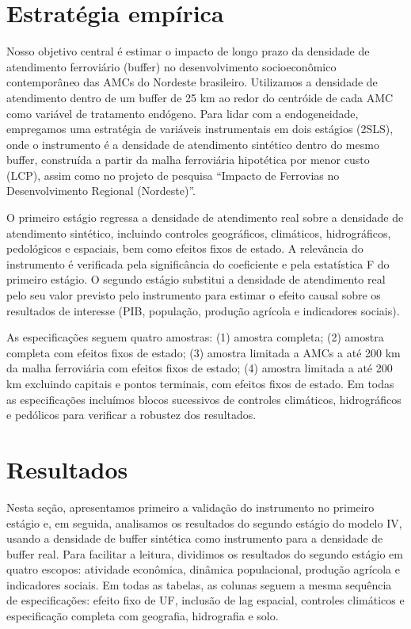 \documentclass[12pt,a4paper]{article}
\begin{document}
\section{Estratégia empírica}
Nosso objetivo central é estimar o impacto de longo prazo da densidade de atendimento ferroviário (buffer) no desenvolvimento socioeconômico contemporâneo das AMCs do Nordeste brasileiro. Utilizamos a densidade de atendimento dentro de um buffer de 25 km ao redor do centróide de cada AMC como variável de tratamento endógeno. Para lidar com a endogeneidade, empregamos uma estratégia de variáveis instrumentais em dois estágios (2SLS), onde o instrumento é a densidade de atendimento sintético dentro do mesmo buffer, construída a partir da malha ferroviária hipotética por menor custo (LCP), assim como no projeto de pesquisa “Impacto de Ferrovias no Desenvolvimento Regional (Nordeste)”.

O primeiro estágio regressa a densidade de atendimento real sobre a densidade de atendimento sintético, incluindo controles geográficos, climáticos, hidrográficos, pedológicos e espaciais, bem como efeitos fixos de estado. A relevância do instrumento é verificada pela significância do coeficiente e pela estatística F do primeiro estágio. O segundo estágio substitui a densidade de atendimento real pelo seu valor previsto pelo instrumento para estimar o efeito causal sobre os resultados de interesse (PIB, população, produção agrícola e indicadores sociais).

As especificações seguem quatro amostras: (1) amostra completa; (2) amostra completa com efeitos fixos de estado; (3) amostra limitada a AMCs a até 200 km da malha ferroviária com efeitos fixos de estado; (4) amostra limitada a até 200 km excluindo capitais e pontos terminais, com efeitos fixos de estado. Em todas as especificações incluímos blocos sucessivos de controles climáticos, hidrográficos e pedólicos para verificar a robustez dos resultados.
\section{Resultados}
Nesta seção, apresentamos primeiro a validação do instrumento no primeiro estágio e, em seguida, analisamos os resultados do segundo estágio do modelo IV, usando a densidade de buffer sintética como instrumento para a densidade de buffer real. Para facilitar a leitura, dividimos os resultados do segundo estágio em quatro escopos: atividade econômica, dinâmica populacional, produção agrícola e indicadores sociais. Em todas as tabelas, as colunas seguem a mesma sequência de especificações: efeito fixo de UF, inclusão de lag espacial, controles climáticos e especificação completa com geografia, hidrografia e solo.
\end{document}

